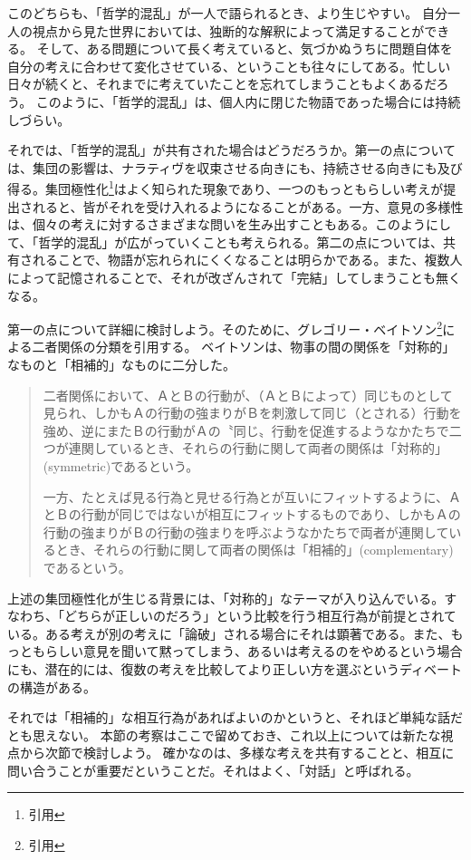 \documentclass[b5j,twoside,twocolumn]{utarticle}
\begin{document}
このどちらも、「哲学的混乱」が一人で語られるとき、より生じやすい。
自分一人の視点から見た世界においては、独断的な解釈によって満足することができる。
そして、ある問題について長く考えていると、気づかぬうちに問題自体を自分の考えに合わせて変化させている、ということも往々にしてある。忙しい日々が続くと、それまでに考えていたことを忘れてしまうこともよくあるだろう。
このように、「哲学的混乱」は、個人内に閉じた物語であった場合には持続しづらい。


それでは、「哲学的混乱」が共有された場合はどうだろうか。第一の点については、集団の影響は、ナラティヴを収束させる向きにも、持続させる向きにも及び得る。集団極性化\footnote{引用}はよく知られた現象であり、一つのもっともらしい考えが提出されると、皆がそれを受け入れるようになることがある。一方、意見の多様性は、個々の考えに対するさまざまな問いを生み出すこともある。このようにして、「哲学的混乱」が広がっていくことも考えられる。第二の点については、共有されることで、物語が忘れられにくくなることは明らかである。また、複数人によって記憶されることで、それが改ざんされて「完結」してしまうことも無くなる。


第一の点について詳細に検討しよう。そのために、グレゴリー・ベイトソン\footnote{引用}による二者関係の分類を引用する。
ベイトソンは、物事の間の関係を「対称的」なものと「相補的」なものに二分した。
\begin{quote}
二者関係において、ＡとＢの行動が、（ＡとＢによって）同じものとして見られ、しかもＡの行動の強まりがＢを刺激して同じ（とされる）行動を強め、逆にまたＢの行動がＡの〝同じ〟行動を促進するようなかたちで二つが連関しているとき、それらの行動に関して両者の関係は「対称的」(symmetric)であるという。


一方、たとえば見る行為と見せる行為とが互いにフィットするように、ＡとＢの行動が同じではないが相互にフィットするものであり、しかもＡの行動の強まりがＢの行動の強まりを呼ぶようなかたちで両者が連関しているとき、それらの行動に関して両者の関係は「相補的」(complementary)であるという。%
\end{quote}


上述の集団極性化が生じる背景には、「対称的」なテーマが入り込んでいる。すなわち、「どちらが正しいのだろう」という比較を行う相互行為が前提とされている。ある考えが別の考えに「論破」される場合にそれは顕著である。また、もっともらしい意見を聞いて黙ってしまう、あるいは考えるのをやめるという場合にも、潜在的には、復数の考えを比較してより正しい方を選ぶというディベートの構造がある。


それでは「相補的」な相互行為があればよいのかというと、それほど単純な話だとも思えない。
本節の考察はここで留めておき、これ以上については新たな視点から次節で検討しよう。
確かなのは、多様な考えを共有することと、相互に問い合うことが重要だということだ。それはよく、「対話」と呼ばれる。
\end{document}
